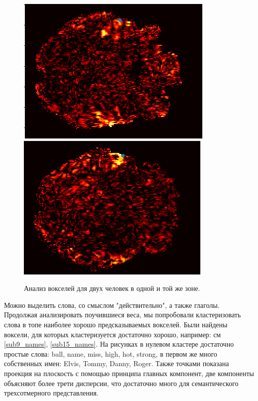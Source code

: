 \documentclass[pdftex,ptm,12pt,a4paper]{report}
\theoremstyle{definition}
\begin{document}
\begin{figure}
\centering
\includegraphics[scale=0.5]{images/voxel_to_choose1.png} 
\includegraphics[scale=0.5]{images/voxel_to_choose2.png} 
\caption{Анализ вокселей для двух человек в одной и той же зоне.}
\label{voxel_to_choose}
\end{figure}

Можно выделить слова, со смыслом "действительно", а также глаголы. Продолжая анализировать поучившиеся веса, мы попробовали кластеризовать слова в топе наиболее хорошо предсказываемых вокселей. Были найдены воксели, для которых кластеризуется достаточно хорошо, например: см \ref{sub9_names}, \ref{sub15_names}. На рисунках в нулевом кластере достаточно простые слова: ball, name, miss, high, hot, strong, в первом же много собственных имен: Elvis, Tommy, Danny, Roger. Также точками показана проекция на плоскость с помощью принципа главных компонент, две компоненты объясняют более трети дисперсии, что достаточно много для семантического трехсотмерного представления.
\end{document}
